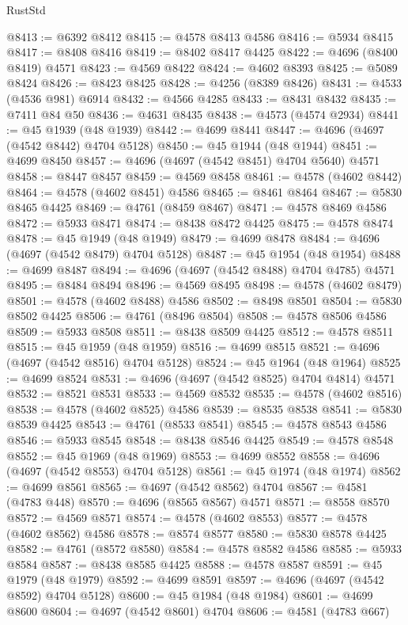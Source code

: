 \begin{lexlean}{RustStd}
\begin{coremodule}
@8413 := @6392 @8412
@8415 := @4578 @8413 @4586
@8416 := @5934 @8415
@8417 := @8408 @8416
@8419 := @8402 @8417 @4425
@8422 := @4696 (@8400 @8419) @4571
@8423 := @4569 @8422
@8424 := @4602 @8393
@8425 := @5089 @8424
@8426 := @8423 @8425
@8428 := @4256 (@8389 @8426)
@8431 := @4533 (@4536 @981) @6914
@8432 := @4566 @4285
@8433 := @8431 @8432
@8435 := @7411 @84 @50
@8436 := @4631 @8435
@8438 := @4573 (@4574 @2934)
@8441 := @45 @1939 (@48 @1939)
@8442 := @4699 @8441
@8447 := @4696 (@4697 (@4542 @8442) @4704 @5128)
@8450 := @45 @1944 (@48 @1944)
@8451 := @4699 @8450
@8457 := @4696 (@4697 (@4542 @8451) @4704 @5640) @4571
@8458 := @8447 @8457
@8459 := @4569 @8458
@8461 := @4578 (@4602 @8442)
@8464 := @4578 (@4602 @8451) @4586
@8465 := @8461 @8464
@8467 := @5830 @8465 @4425
@8469 := @4761 (@8459 @8467)
@8471 := @4578 @8469 @4586
@8472 := @5933 @8471
@8474 := @8438 @8472 @4425
@8475 := @4578 @8474
@8478 := @45 @1949 (@48 @1949)
@8479 := @4699 @8478
@8484 := @4696 (@4697 (@4542 @8479) @4704 @5128)
@8487 := @45 @1954 (@48 @1954)
@8488 := @4699 @8487
@8494 := @4696 (@4697 (@4542 @8488) @4704 @4785) @4571
@8495 := @8484 @8494
@8496 := @4569 @8495
@8498 := @4578 (@4602 @8479)
@8501 := @4578 (@4602 @8488) @4586
@8502 := @8498 @8501
@8504 := @5830 @8502 @4425
@8506 := @4761 (@8496 @8504)
@8508 := @4578 @8506 @4586
@8509 := @5933 @8508
@8511 := @8438 @8509 @4425
@8512 := @4578 @8511
@8515 := @45 @1959 (@48 @1959)
@8516 := @4699 @8515
@8521 := @4696 (@4697 (@4542 @8516) @4704 @5128)
@8524 := @45 @1964 (@48 @1964)
@8525 := @4699 @8524
@8531 := @4696 (@4697 (@4542 @8525) @4704 @4814) @4571
@8532 := @8521 @8531
@8533 := @4569 @8532
@8535 := @4578 (@4602 @8516)
@8538 := @4578 (@4602 @8525) @4586
@8539 := @8535 @8538
@8541 := @5830 @8539 @4425
@8543 := @4761 (@8533 @8541)
@8545 := @4578 @8543 @4586
@8546 := @5933 @8545
@8548 := @8438 @8546 @4425
@8549 := @4578 @8548
@8552 := @45 @1969 (@48 @1969)
@8553 := @4699 @8552
@8558 := @4696 (@4697 (@4542 @8553) @4704 @5128)
@8561 := @45 @1974 (@48 @1974)
@8562 := @4699 @8561
@8565 := @4697 (@4542 @8562) @4704
@8567 := @4581 (@4783 @448)
@8570 := @4696 (@8565 @8567) @4571
@8571 := @8558 @8570
@8572 := @4569 @8571
@8574 := @4578 (@4602 @8553)
@8577 := @4578 (@4602 @8562) @4586
@8578 := @8574 @8577
@8580 := @5830 @8578 @4425
@8582 := @4761 (@8572 @8580)
@8584 := @4578 @8582 @4586
@8585 := @5933 @8584
@8587 := @8438 @8585 @4425
@8588 := @4578 @8587
@8591 := @45 @1979 (@48 @1979)
@8592 := @4699 @8591
@8597 := @4696 (@4697 (@4542 @8592) @4704 @5128)
@8600 := @45 @1984 (@48 @1984)
@8601 := @4699 @8600
@8604 := @4697 (@4542 @8601) @4704
@8606 := @4581 (@4783 @667)

\end{coremodule}
\end{lexlean}
